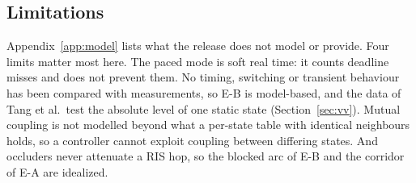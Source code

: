 \subsection{Limitations}\label{sec:disc-limits}
Appendix~\ref{app:model} lists what the release does not model or provide.
Four limits matter most here. The paced mode is soft real time: it counts
deadline misses and does not prevent them. No timing, switching or transient behaviour has
been compared with measurements, so E-B is model-based, and the data of Tang et al.\ test the
absolute level of one static state (Section~\ref{sec:vv}). Mutual coupling is not modelled beyond what a per-state table with
identical neighbours holds, so a controller cannot exploit coupling between differing states. And
occluders never attenuate a RIS hop, so the blocked arc of E-B and the corridor of E-A are
idealized.
